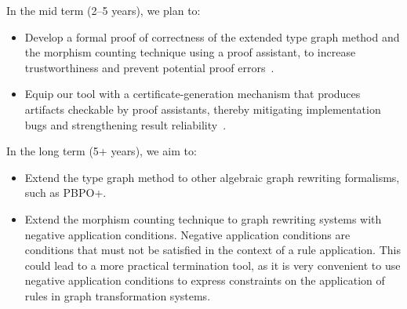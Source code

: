 In the mid term (2--5 years), we plan to:
    \begin{itemize}
      \item Develop a formal proof of correctness of the extended type graph method and the morphism counting technique using a proof assistant, to increase trustworthiness and prevent potential proof errors~\cite{contejean2004certified}.
      \item Equip our tool with a certificate-generation mechanism that produces artifacts checkable by proof assistants, thereby mitigating implementation bugs and strengthening result reliability~\cite{contejean2007certification,contejean2010a3pat}.
    \end{itemize}

In the long term (5+ years), we aim to:
    \begin{itemize}
      \item Extend the type graph method to other algebraic graph rewriting formalisms, such as PBPO+.
      \item Extend the morphism counting technique to graph rewriting systems with negative application conditions. Negative application conditions are conditions that must not be satisfied in the context of a rule application. This could lead to a more practical termination tool, as it is very convenient to use negative application conditions to express constraints on the application of rules in graph transformation systems.
    \end{itemize}